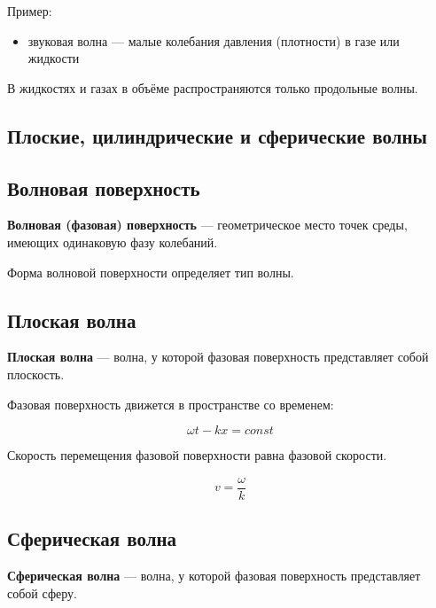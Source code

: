 \documentclass[a4paper,12pt]{article}
\begin{document}
Пример:

\begin{itemize}
\item звуковая волна — малые колебания давления (плотности) в газе или жидкости
\end{itemize}

В жидкостях и газах в объёме распространяются только продольные волны.

\subsection*{Плоские, цилиндрические и сферические волны}

\subsection*{Волновая поверхность}

\begin{definitionbox}
\textbf{Волновая (фазовая) поверхность} — геометрическое место точек среды, имеющих одинаковую фазу колебаний.
\end{definitionbox}

Форма волновой поверхности определяет тип волны.

\subsection*{Плоская волна}

\begin{definitionbox}
\textbf{Плоская волна} — волна, у которой фазовая поверхность представляет собой плоскость.
\end{definitionbox}

Фазовая поверхность движется в пространстве со временем:

\[
\omega t - kx = const
\]
 
\begin{theorembox}
Скорость перемещения фазовой поверхности равна фазовой скорости.
\end{theorembox}

\[
v =
\frac{\omega}{k}
\]

\subsection*{Сферическая волна}

\begin{definitionbox}
\textbf{Сферическая волна} — волна, у которой фазовая поверхность представляет собой сферу.
\end{definitionbox}
\end{document}

